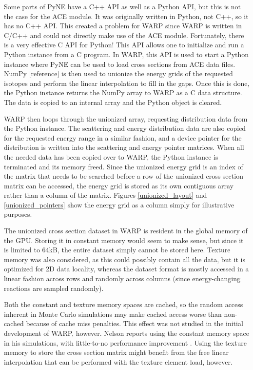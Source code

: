 Some parts of PyNE have a C++ API as well as a Python API, but this is not the case for the ACE module.  It was originally written in Python, not C++, so it has no C++ API.  This created a problem for WARP since WARP is written in C/C++ and could not directly make use of the ACE module.  Fortunately, there is a very effective C API for Python!  This API allows one to initialize and run a Python instance from a C program.  In WARP, this API is used to start a Python instance where PyNE can be used to load cross sections from ACE data files.  NumPy [reference] is then used to unionize the energy grids of the requested isotopes and perform the linear interpolation to fill in the gaps.  Once this is done, the Python instance returns the NumPy array to WARP as a C data structure.  The data is copied to an internal array and the Python object is cleared.  

WARP then loops through the unionized array, requesting distribution data from the Python instance.  The scattering and energy distribution data are also copied for the requested energy range in a similar fashion, and a device pointer for the distribution is written into the scattering and energy pointer matrices.  When all the needed data has been copied over to WARP, the Python instance is terminated and its memory freed.  Since the unionized energy grid is an index of the matrix that needs to be searched before a row of the unionized cross section matrix can be accessed, the energy grid is stored as its own contiguous array rather than a column of the matrix.  Figures \ref{unionized_layout} and \ref{unionized_pointers} show the energy grid as a column simply for illustrative purposes.

The unionized cross section dataset in WARP is resident in the global memory of the GPU.  Storing it in constant memory would seem to make sense, but since it is limited to 64kB, the entire dataset simply cannot be stored here.  Texture memory was also considered, as this could possibly contain all the data, but it is optimized for 2D data locality, whereas the dataset format is mostly accessed in a linear fashion across rows and randomly across columns (since energy-changing reactions are sampled randomly).  

Both the constant and texture memory spaces are cached, so the random access inherent in Monte Carlo simulations may make cached access worse than non-cached because of cache miss penalties.  This effect was not studied in the initial development of WARP, however.  Nelson reports using the constant memory space in his simulations, with little-to-no performance improvement \cite{nelson}.  Using the texture memory to store the cross section matrix might benefit from the free linear interpolation that can be performed with the texture element load, however. %

